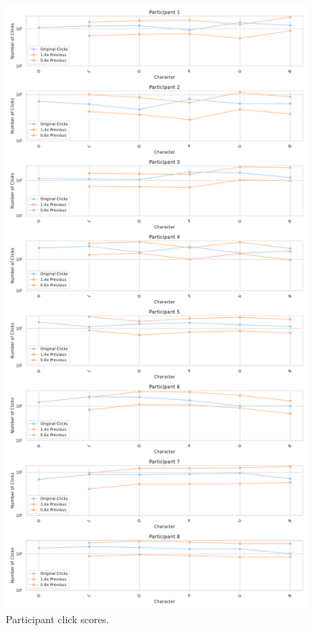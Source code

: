 \begin{table}
    \caption{Second study participant data}
    \label{tab:study2_participant_data}
\end{table}
\begin{figure}
    \centering
    \includegraphics[width=0.5\linewidth]{src/pictures/Study2Data_questionnaire/participantPlots.pdf}
    \caption{Participant click scores.}
    \label{fig:participant_clicks-secondStudy}
\end{figure}

